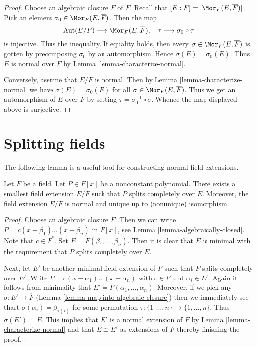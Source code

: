 \begin{proof}
Choose an algebraic closure $\overline{F}$ of $F$. Recall that
$[E : F] = |\Mor_F(E, \overline{F})|$. Pick an element
$\sigma_0 \in \Mor_F(E, \overline{F})$. Then the map
$$
\text{Aut}(E/F) \longrightarrow \Mor_F(E, \overline{F}),\quad
\tau \longmapsto \sigma_0 \circ \tau
$$
is injective. Thus the inequality. If equality holds, then
every $\sigma \in \Mor_F(E, \overline{F})$ is gotten by precomposing
$\sigma_0$ by an automorphism. Hence $\sigma(E) = \sigma_0(E)$.
Thus $E$ is normal over $F$ by Lemma \ref{lemma-characterize-normal}.

\medskip\noindent
Conversely, assume that $E/F$ is normal. Then by
Lemma \ref{lemma-characterize-normal} we have $\sigma(E) = \sigma_0(E)$
for all $\sigma \in \Mor_F(E, \overline{F})$.
Thus we get an automorphism of $E$ over $F$ by setting
$\tau = \sigma_0^{-1} \circ \sigma$. Whence the map displayed above
is surjective.
\end{proof}







\section{Splitting fields}
\label{section-splitting-fieds}

\noindent
The following lemma is a useful tool for constructing normal field extensions.

\begin{lemma}
\label{lemma-splitting-field}
Let $F$ be a field. Let $P \in F[x]$ be a nonconstant polynomial.
There exists a smallest field extension $E/F$ such that $P$
splits completely over $E$. Moreover, the field extension $E/F$ is normal
and unique up to (nonunique) isomorphism.
\end{lemma}

\begin{proof}
Choose an algebraic closure $\overline{F}$. Then we can write
$P = c (x - \beta_1) \ldots (x - \beta_n)$ in $\overline{F}[x]$, see
Lemma \ref{lemma-algebraically-closed}. Note that $c \in F^*$. Set
$E = F(\beta_1, \ldots, \beta_n)$. Then it is clear that $E$ is
minimal with the requirement that $P$ splits completely over $E$.

\medskip\noindent
Next, let $E'$ be another minimal field extension of $F$ such that
$P$ splits completely over $E'$. Write
$P = c (x - \alpha_1) \ldots (x - \alpha_n)$ with $c \in F$ and
$\alpha_i \in E'$. Again it follows from minimality that
$E' = F(\alpha_1, \ldots, \alpha_n)$. Moreover, if we pick
any $\sigma : E' \to \overline{F}$
(Lemma \ref{lemma-map-into-algebraic-closure})
then we immediately see thart $\sigma(\alpha_i) = \beta_{\tau(i)}$
for some permutation $\tau : \{1, \ldots, n\} \to \{1, \ldots, n\}$.
Thus $\sigma(E') = E$. This implies that $E'$ is a normal extension
of $F$ by Lemma \ref{lemma-characterize-normal}
and that $E \cong E'$ as extensions of $F$ thereby finishing the proof.
\end{proof}

